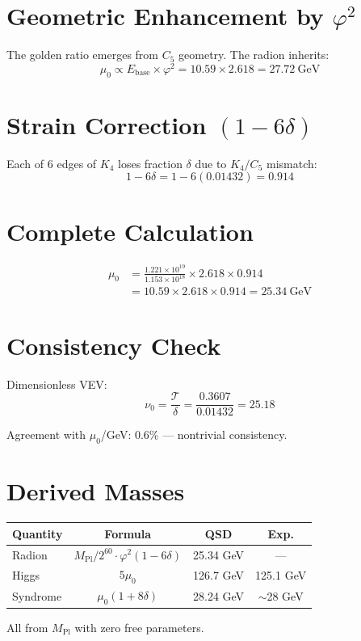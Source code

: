 \documentclass[11pt,a4paper]{article}
\theoremstyle{definition}
\newcommand{\Tc}{\mathcal{T}}
\newcommand{\dgeo}{\delta}
\newcommand{\Mpl}{M_{\text{Pl}}}
\newcommand{\murad}{\mu_0}
\newcommand{\nurad}{\nu_0}
\begin{document}
\section{Geometric Enhancement by $\varphi^2$}

The golden ratio emerges from $C_5$ geometry. The radion inherits:
\begin{equation}
\murad \propto E_{\text{base}} \times \varphi^2 = 10.59 \times 2.618 = 27.72~\text{GeV}
\end{equation}

\section{Strain Correction $(1 - 6\dgeo)$}

Each of 6 edges of $K_4$ loses fraction $\dgeo$ due to $K_4/C_5$ mismatch:
\begin{equation}
1 - 6\dgeo = 1 - 6(0.01432) = 0.914
\end{equation}

\section{Complete Calculation}

\begin{align}
\murad &= \frac{1.221 \times 10^{19}}{1.153 \times 10^{18}} \times 2.618 \times 0.914 \\
&= 10.59 \times 2.618 \times 0.914 = \boxed{25.34~\text{GeV}}
\end{align}

\section{Consistency Check}

Dimensionless VEV:
\begin{equation}
\nurad = \frac{\Tc}{\dgeo} = \frac{0.3607}{0.01432} = 25.18
\end{equation}

Agreement with $\murad$/GeV: 0.6\% --- nontrivial consistency.

\section{Derived Masses}

\begin{table}[h]
\centering
\begin{tabular}{lccc}
\toprule
\textbf{Quantity} & \textbf{Formula} & \textbf{QSD} & \textbf{Exp.} \\
\midrule
Radion & $\Mpl/2^{60} \cdot \varphi^2(1-6\dgeo)$ & 25.34 GeV & --- \\
Higgs & $5\murad$ & 126.7 GeV & 125.1 GeV \\
Syndrome & $\murad(1+8\dgeo)$ & 28.24 GeV & $\sim$28 GeV \\
\bottomrule
\end{tabular}
\end{table}

All from $\Mpl$ with zero free parameters.
\end{document}
